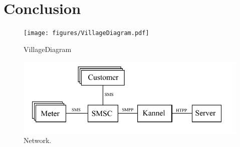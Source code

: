 \documentclass[conference]{IEEEtran}
\begin{document}
\section{Conclusion}


\begin{figure}[]
\begin{center}
\texttt{[image: figures/VillageDiagram.pdf]}
\end{center}
\caption{VillageDiagram}
\label{ShedWiringDiagram}
\end{figure}


\begin{figure}[]
\begin{center}
\includegraphics[width=\columnwidth]{figures/NetworkDiagram.pdf}
\end{center}
\caption{Network.}
\label{SoftwareDiagram}
\end{figure}
\end{document}
